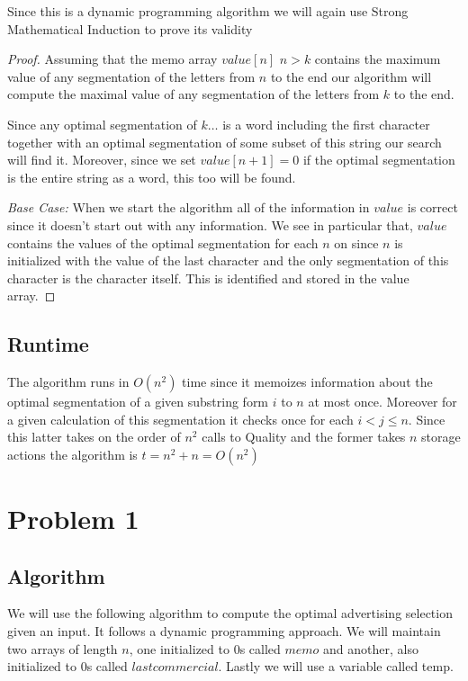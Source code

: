 \documentclass{article}
\begin{document}
Since this is a dynamic programming algorithm we will again use Strong Mathematical Induction to prove its validity

\begin{proof}
Assuming that the memo array $value[n]$ $n>k$ contains the maximum value of any segmentation of the letters from $n$ to the end our algorithm will compute the maximal value of any segmentation of the letters from $k$ to the end.

Since any optimal segmentation of $k\dots$ is a word including the first character together with an optimal segmentation of some subset of this string our search will find it. Moreover, since we set $value[n+1]=0$ if the optimal segmentation is the entire string as a word, this too will be found.

\emph{Base Case: } When we start the algorithm all of the information in $value$ is correct since it doesn't start out with any information. We see in particular that, $value$ contains the values of the optimal segmentation for each $n$ on since $n$ is initialized with the value of the last character and the only segmentation of this character is the character itself. This is identified and stored in the value array.
\end{proof}


\subsection{Runtime}
The algorithm runs in $O(n^2)$ time since it memoizes information about the optimal segmentation of a given substring form $i$ to $n$ at most once. Moreover for a given calculation of this segmentation it checks once for each $i< j \leq n$. Since this latter takes on the order of $n^2$ calls to Quality and the former takes $n$ storage actions the algorithm is $t=n^2+n=O(n^2)$

\section{Problem 1}

\subsection{Algorithm}
We will use the following algorithm to compute the optimal  advertising selection given an input.  It follows a dynamic programming approach. We will maintain two arrays of length $n$, one initialized to 0s called $memo$ and another, also initialized to 0s called $lastcommercial$. Lastly we will use a variable called temp.
\end{document}
